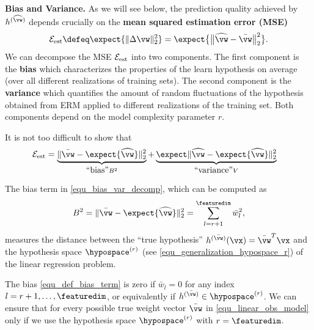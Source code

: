 \documentclass[12pt]{report}
\begin{document}
{\bf Bias and Variance.} 
As we will see below, the prediction quality achieved by $h^{(\widehat{\vw})}$ 
depends crucially on the {\bf mean squared estimation error (MSE)}
\begin{equation}
\label{equ_def_est_err}
\mathcal{E}_{\rm est} \defeq \expect \{  \| \Delta \vw \|^{2}_{2} \} =  \expect \big\{ \big \| \widehat{\vw} - \bar{\vw} \big\|^{2}_{2} \big \}. 
\end{equation}
We can decompose the MSE $\mathcal{E}_{\rm est}$ into two components. 
The first component is the {\bf bias} which characterizes the properties of 
the learn hypothesis on average (over all different realizations of training sets). 
The second component is the {\bf variance} which quantifies the amount of 
random fluctuations of the hypothesis obtained from ERM applied to 
different realizations of the training set. Both components depend on the model 
complexity parameter $r$. 

It is not too difficult to show that 
\vspace*{-1mm}
\begin{align}
\label{equ_bias_var_decomp}
\mathcal{E}_{\rm est} & = \underbrace{ \| \bar{\vw} - \expect \{ \widehat{\vw} \} \|^{2}_{2} }_{\mbox{``bias''} B^2}+ \underbrace{\expect \| \widehat{\vw} - \expect \{ \widehat{\vw} \} \|^{2}_{2}}_{\mbox{``variance''} V} 
\end{align} 

The bias term in \eqref{equ_bias_var_decomp}, which can be computed as 
\vspace*{-3mm}
\begin{equation}
\label{equ_def_bias_term}
B^{2} = \| \bar{\vw} - \expect \{ \widehat{\vw} \} \|^{2}_{2} = \sum_{l=r+1}^{\featuredim} \bar{w}_{l}^2, 
\end{equation} 
measures the distance between the ``true hypothesis'' $h^{(\bar{\vw})}(\vx)=\bar{\vw}^{T} \vx$ 
and the hypothesis space $\hypospace^{(r)}$ (see \eqref{equ_generalization_hypospace_r}) of 
the linear regression problem. 

The bias \eqref{equ_def_bias_term} is zero if $\bar{w}_{l}=0$ for any index 
$l=r+1,\ldots,\featuredim$, or equivalently if $h^{(\bar{\vw})} \in \hypospace^{(r)}$. 
We can ensure that for every possible true weight vector $\bar{\vw}$ in \eqref{equ_linear_obs_model} 
only if we use the hypothesis space $\hypospace^{(r)}$ with $r=\featuredim$. 
\end{document}
